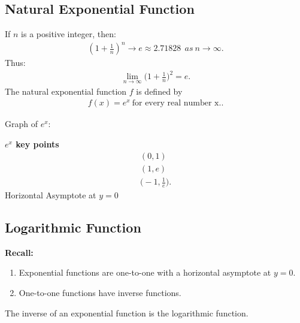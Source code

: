 \documentclass{report}
\begin{document}
      \pagebreak \bigbreak \noindent
      \subsection{Natural Exponential Function}

        \smallbreak \noindent
        \begin{definition}
        If $n$ is a positive integer, then:
        \begin{align*}
          \left(1 + \frac{1}{n}\right)^n \to e \approx 2.71828\ \ as\ n \to \infty
        .\end{align*}
        \bigbreak \noindent 
        Thus:
        \begin{align*}
          \lim\limits_{n \to \infty}{\bigg(1+\frac{1}{n}\bigg)^{2} = e}
        .\end{align*}
        \bigbreak \noindent \bigbreak \noindent 
        The natural exponential function $f$ is defined by 
        \begin{align*}
          f(x) = e^x\ \text{for every real number x.}
        .\end{align*}
          \end{definition}
        \bigbreak \noindent 
        Graph of $e^{x}$:

      \begin{figure}[ht]
          \centering
          \label{fig:ex}
      \end{figure}
      \begin{mdframed}
        \textbf{$e^{x}$ key points}
        \bigbreak \noindent 
        \begin{align*}
          (0,1) \\
          (1,e) \\
         \bigg(-1, \frac{1}{e}\bigg)
        .\end{align*}
        \bigbreak \noindent 
        Horizontal Asymptote at $y=0$
        \bigbreak \noindent 
      \end{mdframed}

      \pagebreak \bigbreak \noindent
      \subsection{Logarithmic Function}
      \bigbreak \noindent 
      \begin{mdframed}
        \textbf{Recall:}
        \begin{enumerate}
          \item Exponential functions are one-to-one with a horizontal asymptote at $y = 0$.
          \item One-to-one functions have inverse functions.
        \end{enumerate}
        \bigbreak \noindent 
        The inverse of an exponential function is the logarithmic function.
      \end{mdframed}
\end{document}
